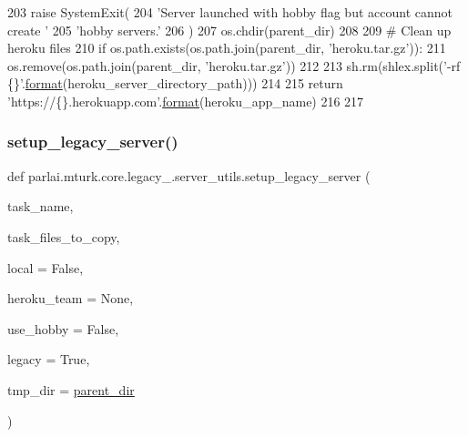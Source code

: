 \begin{DoxyCode}
203             \textcolor{keywordflow}{raise} SystemExit(
204                 \textcolor{stringliteral}{'Server launched with hobby flag but account cannot create '}
205                 \textcolor{stringliteral}{'hobby servers.'}
206             )
207     os.chdir(parent\_dir)
208 
209     \textcolor{comment}{# Clean up heroku files}
210     \textcolor{keywordflow}{if} os.path.exists(os.path.join(parent\_dir, \textcolor{stringliteral}{'heroku.tar.gz'})):
211         os.remove(os.path.join(parent\_dir, \textcolor{stringliteral}{'heroku.tar.gz'}))
212 
213     sh.rm(shlex.split(\textcolor{stringliteral}{'-rf \{\}'}.\hyperlink{namespaceparlai_1_1chat__service_1_1services_1_1messenger_1_1shared__utils_a32e2e2022b824fbaf80c747160b52a76}{format}(heroku\_server\_directory\_path)))
214 
215     \textcolor{keywordflow}{return} \textcolor{stringliteral}{'https://\{\}.herokuapp.com'}.\hyperlink{namespaceparlai_1_1chat__service_1_1services_1_1messenger_1_1shared__utils_a32e2e2022b824fbaf80c747160b52a76}{format}(heroku\_app\_name)
216 
217 
\end{DoxyCode}
\mbox{\label{namespaceparlai_1_1mturk_1_1core_1_1legacy__2018_1_1server__utils_ace7161b60dc11e273f8da7ef409abadf}} 
\subsubsection{\texorpdfstring{setup\+\_\+legacy\+\_\+server()}{setup\_legacy\_server()}}
{\footnotesize\ttfamily def parlai.\+mturk.\+core.\+legacy\+\_.\+server\+\_\+utils.\+setup\+\_\+legacy\+\_\+server (\begin{DoxyParamCaption}\item[{}]{task\+\_\+name,  }\item[{}]{task\+\_\+files\+\_\+to\+\_\+copy,  }\item[{}]{local = {\ttfamily False},  }\item[{}]{heroku\+\_\+team = {\ttfamily None},  }\item[{}]{use\+\_\+hobby = {\ttfamily False},  }\item[{}]{legacy = {\ttfamily True},  }\item[{}]{tmp\+\_\+dir = {\ttfamily \hyperlink{namespaceparlai_1_1mturk_1_1core_1_1legacy__2018_1_1server__utils_a6a871d2f8e5c0768a82ab8fa2e7fadae}{parent\+\_\+dir}} }\end{DoxyParamCaption})}



